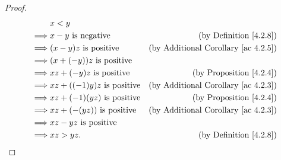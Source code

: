 \begin{proof}
\begin{align*}
& x < y \\
\implies & x - y \text{ is negative} & \text{(by Definition \ref{4.2.8})} \\
\implies & (x - y)z \text{ is positive} & \text{(by Additional Corollary \ref{ac 4.2.5})} \\
\implies & (x + (-y))z \text{ is positive} \\
\implies & xz + (-y)z \text{ is positive} & \text{(by Proposition \ref{4.2.4})} \\
\implies & xz + ((-1)y)z \text{ is positive} & \text{(by Additional Corollary \ref{ac 4.2.3})} \\
\implies & xz + (-1)(yz) \text{ is positive} & \text{(by Proposition \ref{4.2.4})} \\
\implies & xz + (-(yz)) \text{ is positive} & \text{(by Additional Corollary \ref{ac 4.2.3})} \\
\implies & xz - yz \text{ is positive} \\
\implies & xz > yz. & \text{(by Definition \ref{4.2.8})}
\end{align*}
\end{proof}